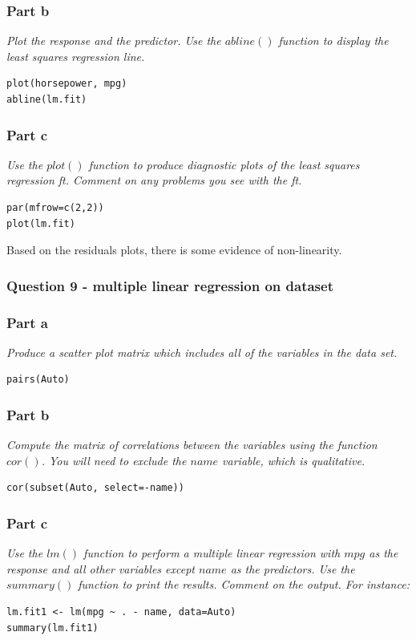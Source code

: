 \documentclass[11pt]{article}
\begin{document}
\subsubsection*{Part b}
\textit{Plot the response and the predictor. Use the $abline()$ function to display the least squares regression line.}
\begin{lstlisting}
plot(horsepower, mpg)
abline(lm.fit)
\end{lstlisting}
\subsubsection*{Part c}
\textit{Use the $plot()$ function to produce diagnostic plots of the least
squares regression ft. Comment on any problems you see with
the ft.}
\begin{lstlisting}
par(mfrow=c(2,2))
plot(lm.fit)
\end{lstlisting}
\noindent Based on the residuals plots, there is some evidence of non-linearity.

\subsubsection{Question 9 - multiple linear regression on dataset}
\subsubsection*{Part a}
\textit{Produce a scatter plot matrix which includes all of the variables in the data set.}
\begin{lstlisting}
pairs(Auto)
\end{lstlisting}
\subsubsection*{Part b}
\textit{Compute the matrix of correlations between the variables using the function $cor()$. You will need to exclude the $name$ variable, which is qualitative.}
\begin{lstlisting}
cor(subset(Auto, select=-name))
\end{lstlisting}
\subsubsection*{Part c}
\textit{Use the $lm()$ function to perform a multiple linear regression with $mpg$ as the response and all other variables except $name$ as the predictors. Use the $summary()$ function to print the results. Comment on the output. For instance:}
\begin{lstlisting}
lm.fit1 <- lm(mpg ~ . - name, data=Auto)
summary(lm.fit1)
\end{lstlisting}
\end{document}
